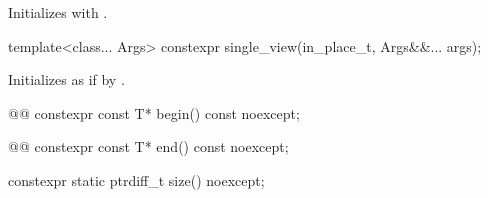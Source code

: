 \begin{itemdescr}
\pnum
\effects Initializes  with .
\end{itemdescr}

%
\begin{itemdecl}
template<class... Args>
constexpr single_view(in_place_t, Args&&... args);
\end{itemdecl}

\begin{itemdescr}
\pnum
\effects Initializes  as if by
.
\end{itemdescr}

%
\begin{itemdecl}
@@
constexpr const T* begin() const noexcept;
\end{itemdecl}

\begin{itemdescr}
\pnum
{}

\pnum
\oldtxt{\returns} 
\end{itemdescr}

%
\begin{itemdecl}
@@
constexpr const T* end() const noexcept;
\end{itemdecl}

\begin{itemdescr}
\pnum
{}

\pnum
\oldtxt{\returns} 
\end{itemdescr}

%
\begin{itemdecl}
constexpr static ptrdiff_t size() noexcept;
\end{itemdecl}

\begin{itemdescr}
\pnum
{}

\pnum
\oldtxt{\returns}  
\end{itemdescr}

